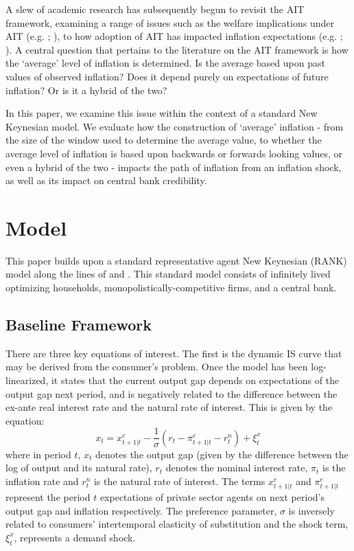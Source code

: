 \documentclass[english,authoryear,12pt]{elsarticle}
\begin{document}
A slew of academic research has subsequently begun to revisit the AIT framework, examining a range of issues such as the welfare implications under AIT (e.g. \citealp{budianto_average_2020}; \citealp{eo_average_2020}), to how adoption of AIT has impacted inflation expectations (e.g. \citealp{coibion_average_2020}; \citealp{hoffmann_would_2022}). A central question that pertains to the literature on the AIT framework is how the `average' level of inflation is determined. Is the average based upon past values of observed inflation? Does it depend purely on expectations of future inflation? Or is it a hybrid of the two? 

In this paper, we examine this issue within the context of a standard New Keynesian model. We evaluate how the construction of `average' inflation - from the size of the window used to determine the average value, to whether the average level of inflation is based upon backwards or forwards looking values, or even a hybrid of the two - impacts the path of inflation from an inflation shock, as well as its impact on central bank credibility.


\section{\label{Model}Model}
This paper builds upon a standard representative agent New Keynesian (RANK) model along the lines of \cite{clarida1999science} and \cite{steinsson2003optimal}. This standard model consists of infinitely lived optimizing households, monopolistically-competitive firms, and a central bank.  

\subsection{Baseline Framework}
There are three key equations of interest. The first is the dynamic IS curve that may be derived from the consumer's problem. Once the model has been log-linearized, it states that the current output gap depends on expectations of the output gap next period, and is negatively related to the difference between the ex-ante real interest rate and the natural rate of interest. This is given by the equation:
\begin{equation}\label{eq:ISe}
	x_t = x_{t+1|t}^e - \frac{1}{\sigma} \left( r_t - \pi_{t+1|t}^e -r^n_t \right) + \xi_t^{x}
\end{equation}
where in period $t$, $x_t$ denotes the output gap (given by the difference between the log of output and its natural rate), $r_t$ denotes the nominal interest rate, $\pi_t$ is the inflation rate and $r^n_t$ is the natural rate of interest. The terms $x_{t+1|t}^e$ and $\pi_{t+1|t}^e$ represent the period $t$ expectations of private sector agents on next period's output gap and inflation respectively. The preference parameter, $\sigma$ is inversely related to consumers' intertemporal elasticity of substitution and the shock term, $\xi_t^x$, represents a demand shock.
\end{document}
